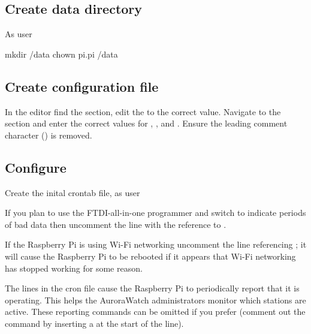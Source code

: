 \subsection{Create data directory}
As user \rootUser
\begin{Cmd}
mkdir /data
chown pi.pi /data
\end{Cmd}

\subsection{Create configuration file}

\ifdef{\caluniumMagManual}{%
}{}
\ifdef{\raspiMagManual}{%
}{}
\ifdef{\bgsMagManual}{%
}{}

In the editor find the \code{[DEFAULT]} section, edit the 
to the correct value. Navigate to the \code{[upload]} section and
enter the correct values for , ,
 and . Ensure the leading comment character
(\code{\#}) is removed. 

\subsection{Configure \protect{}}
\label{sec:cron-configuration}

Create the inital crontab file, as user \piUser
%

If you plan to use the FTDI-all-in-one programmer and switch to
indicate periods of bad data then uncomment the line with the
reference to .

If the Raspberry Pi is using Wi-Fi networking uncomment the line
referencing ; it will cause the Raspberry
Pi to be rebooted if it appears that Wi-Fi networking has stopped
working for some reason.

The  lines in the cron file cause the Raspberry Pi to
periodically report that it is operating. This helps the AuroraWatch
administrators monitor which stations are active. These reporting
commands can be omitted if you prefer (comment out the command by
inserting a \code{\#} at the start of the line).

